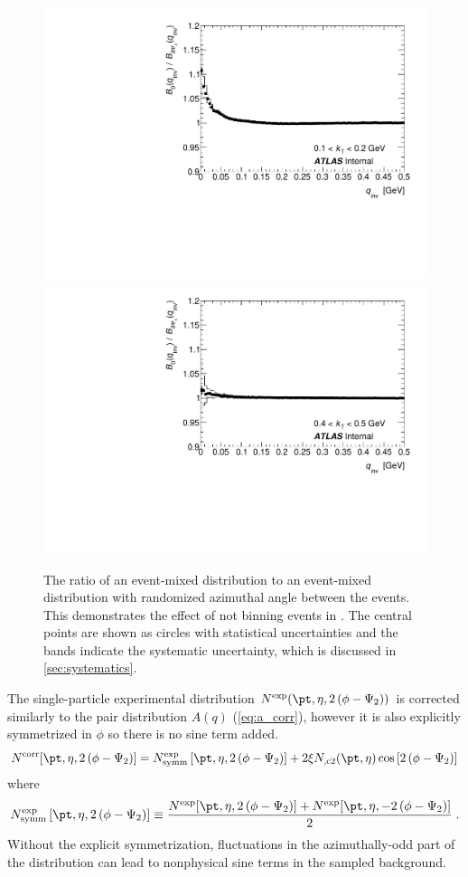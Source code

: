 \begin{figure}[t]
\centering
\includegraphics[width=.49\linewidth]{phi_corr_to_uncorr_ratio_kt0.pdf}
\includegraphics[width=.49\linewidth]{phi_corr_to_uncorr_ratio_kt3.pdf}\\
\caption{The ratio of an event-mixed distribution to an event-mixed distribution with randomized azimuthal angle between the events. This demonstrates the effect of not binning events in \psit. The central points are shown as circles with statistical uncertainties and the bands indicate the systematic uncertainty, which is discussed in \cref{sec:systematics}.}
\label{fig:phi_corr_to_uncorr_ratio}
\end{figure}

The single-particle experimental distribution $N^\mathrm{exp}(\pt, \eta, \tdpp)$ is corrected similarly to the pair distribution $A(q)$ (\cref{eq:a_corr}), however it is also explicitly symmetrized in $\phi$ so there is no sine term added.
\begin{equation}
  \label{eq:n_corr}
  N^\textrm{corr}[\pt, \eta, \tdpp] = N^\textrm{exp}_\textrm{symm}\left[\pt, \eta, \tdpp\right] + 2\xi N_\textrm{,c2}(\pt, \eta) \cos\left[\tdpp\right]
\end{equation}
where
\begin{equation}
N^\textrm{exp}_\textrm{symm}\left[\pt, \eta, \tdpp\right] \equiv \frac{N^\textrm{exp}[\pt, \eta, \tdpp] + N^\textrm{exp}[\pt, \eta, -\tdpp]}{2}  \; .
\end{equation}
Without the explicit symmetrization, fluctuations in the azimuthally-odd part of the distribution can lead to nonphysical sine terms in the sampled background. %

